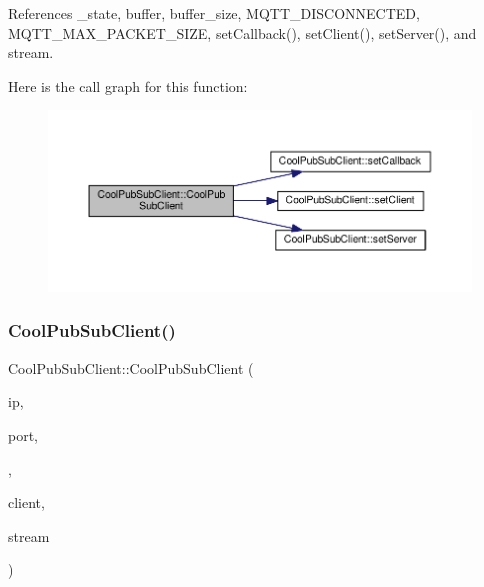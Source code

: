 References \+\_\+state, buffer, buffer\+\_\+size, M\+Q\+T\+T\+\_\+\+D\+I\+S\+C\+O\+N\+N\+E\+C\+T\+ED, M\+Q\+T\+T\+\_\+\+M\+A\+X\+\_\+\+P\+A\+C\+K\+E\+T\+\_\+\+S\+I\+ZE, set\+Callback(), set\+Client(), set\+Server(), and stream.

Here is the call graph for this function\+:\nopagebreak
\begin{figure}[H]
\begin{center}
\leavevmode
\includegraphics[width=350pt]{d8/d4b/class_cool_pub_sub_client_afc703702b40ba925377d0b9cd401319e_cgraph}
\end{center}
\end{figure}
\mbox{\label{class_cool_pub_sub_client_a08309a2cf058099fa5c96c198f777647}} 
\subsubsection{\texorpdfstring{Cool\+Pub\+Sub\+Client()}{CoolPubSubClient()}\hspace{0.1cm}{\footnotesize\ttfamily [10/14]}}
{\footnotesize\ttfamily Cool\+Pub\+Sub\+Client\+::\+Cool\+Pub\+Sub\+Client (\begin{DoxyParamCaption}\item[{uint8\+\_\+t $\ast$}]{ip,  }\item[{uint16\+\_\+t}]{port,  }\item[{\hyperlink{class_cool_pub_sub_client_a021ec75e9fbaf658370b8005ccfddc14}{M\+Q\+T\+T\+\_\+\+C\+A\+L\+L\+B\+A\+C\+K\+\_\+\+S\+I\+G\+N\+A\+T\+U\+RE}}]{,  }\item[{Client \&}]{client,  }\item[{Stream \&}]{stream }\end{DoxyParamCaption})}



